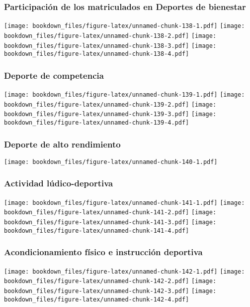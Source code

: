 \documentclass[]{article}
\theoremstyle{definition}
\theoremstyle{definition}
\theoremstyle{definition}
\theoremstyle{remark}
\begin{document}
\subsubsection{Participación de los matriculados en Deportes de
bienestar}\label{participacion-de-los-matriculados-en-deportes-de-bienestar}

\texttt{[image: bookdown\_files/figure-latex/unnamed-chunk-138-1.pdf]}
\texttt{[image: bookdown\_files/figure-latex/unnamed-chunk-138-2.pdf]}
\texttt{[image: bookdown\_files/figure-latex/unnamed-chunk-138-3.pdf]}
\texttt{[image: bookdown\_files/figure-latex/unnamed-chunk-138-4.pdf]}

\subsubsection{Deporte de competencia}\label{deporte-de-competencia}

\texttt{[image: bookdown\_files/figure-latex/unnamed-chunk-139-1.pdf]}
\texttt{[image: bookdown\_files/figure-latex/unnamed-chunk-139-2.pdf]}
\texttt{[image: bookdown\_files/figure-latex/unnamed-chunk-139-3.pdf]}
\texttt{[image: bookdown\_files/figure-latex/unnamed-chunk-139-4.pdf]}

\subsubsection{Deporte de alto
rendimiento}\label{deporte-de-alto-rendimiento}

\texttt{[image: bookdown\_files/figure-latex/unnamed-chunk-140-1.pdf]}

\subsubsection{Actividad
lúdico-deportiva}\label{actividad-ludico-deportiva}

\texttt{[image: bookdown\_files/figure-latex/unnamed-chunk-141-1.pdf]}
\texttt{[image: bookdown\_files/figure-latex/unnamed-chunk-141-2.pdf]}
\texttt{[image: bookdown\_files/figure-latex/unnamed-chunk-141-3.pdf]}
\texttt{[image: bookdown\_files/figure-latex/unnamed-chunk-141-4.pdf]}

\subsubsection{Acondicionamiento físico e instrucción
deportiva}\label{acondicionamiento-fisico-e-instruccion-deportiva}

\texttt{[image: bookdown\_files/figure-latex/unnamed-chunk-142-1.pdf]}
\texttt{[image: bookdown\_files/figure-latex/unnamed-chunk-142-2.pdf]}
\texttt{[image: bookdown\_files/figure-latex/unnamed-chunk-142-3.pdf]}
\texttt{[image: bookdown\_files/figure-latex/unnamed-chunk-142-4.pdf]}
\end{document}
